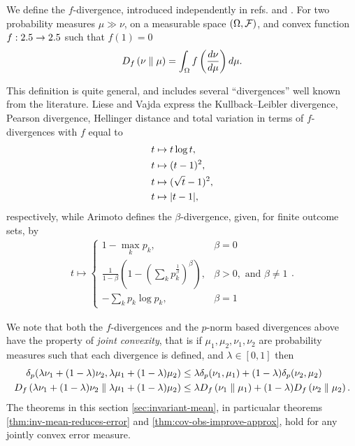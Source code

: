 We define the $f$-divergence, introduced independently in refs. \cite{10.2307/2984279} and \cite{der1964informationstheoretische}. For two probability measures $\mu\gg\nu$, on a measurable space $(\Omega, \mathcal{F})$, and convex function $f:2.5\to2.5$ such that $f(1) = 0$
\begin{align}\label{eqn:f-div-defn}
  D_{f}\left({\nu}\parallel{\mu}\right) = \int_\Omega f\left(\frac{d\nu}{d\mu}\right) d\mu.
\end{align}

This definition is quite general, and includes several ``divergences'' well known from the literature. Liese and Vajda \cite{1705001g} express the Kullback–Leibler divergence, Pearson divergence, Hellinger distance and total variation in terms of $f$-divergences with $f$ equal to
\begin{align}
  t&\mapsto t\log t,\\
  t&\mapsto (t-1)^2,\\
  t&\mapsto (\sqrt{t} -1)^2,\\
  t&\mapsto {\left\lvert{t-1}\right\rvert},
\end{align}
respectively, while Arimoto defines the $\beta$-divergence, given, for finite outcome sets, by
\begin{align}
  t \mapsto \begin{cases}1-\max_k p_k, & \beta = 0\\ \frac{1}{1-\beta}\left(1- \left(\sum_k p_k^\frac{1}{\beta}\right)^\beta\right), &\beta >0, \text{ and } \beta\neq 1 \\ -\sum_k p_k \log p_k, & \beta = 1\end{cases}.
\end{align}

We note that both the $f$-divergences and the $p$-norm based divergences above have the property of \emph{joint convexity}, that is if $\mu_1, \mu_2, \nu_1,\nu_2$ are probability measures such that each divergence is defined, and $\lambda\in [0,1]$ then
\begin{align}
  \delta_p(\lambda\nu_1 + (1-\lambda)\nu_2, \lambda\mu_1 + (1-\lambda)\mu_2) &\leq \lambda \delta_p(\nu_1, \mu_1) + (1-\lambda)\delta_p(\nu_2, \mu_2)\\
  D_{f}\left({\lambda\nu_1 + (1-\lambda)\nu_2}\parallel{\lambda\mu_1 + (1-\lambda)\mu_2}\right) &\leq  \lambda D_{f}\left({\nu_1}\parallel{\mu_1}\right) + (1-\lambda)D_{f}\left({\nu_2}\parallel{\mu_2}\right).
\end{align}
The theorems in this section \ref{sec:invariant-mean}, in particualar theorems \ref{thm:inv-mean-reduces-error} and \ref{thm:cov-obs-improve-approx}, hold for any jointly convex error measure.
